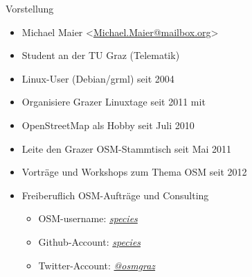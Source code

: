 \documentclass{beamer}
\begin{document}
\begin{frame}{Vorstellung}

  \begin{itemize}
    \item Michael Maier \textless \href{mailto:Michael.Maier@mailbox.org}{Michael.Maier@mailbox.org}\textgreater
    \item Student an der TU Graz (Telematik)
\vspace{0.3cm}
    \item Linux-User (Debian/grml) seit 2004
    \item Organisiere Grazer Linuxtage seit 2011 mit
    \item OpenStreetMap als Hobby seit Juli 2010
    \item Leite den Grazer OSM-Stammtisch seit Mai 2011
\vspace{0.3cm}
    \item Vorträge und Workshops zum Thema OSM seit 2012
    \item Freiberuflich OSM-Aufträge und Consulting
    \begin{itemize}
      \item OSM-username: \emph{\href{http://www.openstreetmap.org/user/species}{species}}
      \item Github-Account: \emph{\href{https://github.com/species}{species}}
      \item Twitter-Account: \emph{\href{https://twitter.com/osmgraz}{@osmgraz}}
    \end{itemize}
  \end{itemize}
\end{frame}
\end{document}
